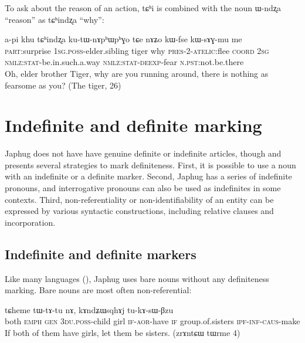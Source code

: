 \documentclass[oldfontcommands,oneside,a4paper,11pt]{memoir}
\newcommand{\ipa}[1]{{\phon #1}} %
\newcommand{\aor}{\textsc{aor}}
\newcommand{\caus}{\textsc{caus}}
\newcommand{\coord}{\textsc{coord}}
\newcommand{\du}{\textsc{du}}
\newcommand{\emphat}{\textsc{emph}}
\newcommand{\gen}{\textsc{gen}}
\newcommand{\inftv}{\textsc{inf}}
\newcommand{\ipf}{\textsc{ipf}}
\newcommand{\nmlz}{\textsc{nmlz}}
\newcommand{\npst}{\textsc{n.pst}}
\newcommand{\poss}{\textsc{poss}}
\newcommand{\pres}{\textsc{pres}}
\newcommand{\sg}{\textsc{sg}}
\newcommand{\stat}{\textsc{stat}}
\begin{document}
To ask about the reason of an action,  \ipa{tɕʰi} is combined with the noun \ipa{ɯ-ndʐa} ``reason'' as \ipa{tɕʰindʐa} ``why'':
  \begin{exe}
\ex
\gll    \ipa{ama} 	\ipa{a-pi} 	\ipa{khu} 	\ipa{tɕʰindʐa} 	\ipa{ku-tɯ-nɤpʰɯpʰɣo} 	\ipa{tɕe} 	\ipa{nɤʑo} 	\ipa{kɯ-fse} 	\ipa{kɯ-sɤɣ-mu} 	\ipa{me}   \\
\textsc{part}:surprise 1\sg{}.\poss{}-elder.sibling   tiger why \pres{}-2-\textsc{atelic}:flee \coord{} 2\sg{} \nmlz{}:\stat{}-be.in.such.a.way \nmlz{}:\stat{}-\textsc{deexp}-fear \npst{}:not.be.there \\
\glt Oh, elder brother Tiger, why are you running around, there is nothing as fearsome as you?  (The tiger, 26)
\end{exe} 

 

\section{Indefinite and definite marking}
Japhug does not have have genuine definite or indefinite articles, though and presents several strategies to mark definiteness. First, it is possible to use a noun with an indefinite or a definite marker. Second, Japhug has a series of indefinite pronouns, and interrogative pronouns can also be used as indefinites in some contexts. Third, non-referentiality or non-identifiability of an entity can be expressed by various syntactic constructions, including relative clauses and incorporation.


\subsection{Indefinite and definite markers}
Like many languages (\citealt[130]{creissels06sgit1}), Japhug  uses bare nouns without any definiteness marking. Bare nouns are most often non-referential:

  \begin{exe}
\ex
\gll \ipa{ʁnaʁna} 		\ipa{tɕheme} 	\ipa{tɯ-tɤ-tu} 	\ipa{nɤ,} 	\ipa{kɤndʑɯsqhɤj} 	\ipa{tu-kɤ-sɯ-βzu} \\
both \emphat{} \gen{} 3\du{}.\poss{}-child girl \textsc{if}-\aor{}-have \textsc{if} group.of.sisters \ipf{}-\inftv{}-\caus{}-make \\
\glt If both of them have girls, let them be sisters. (zrɤntɕɯ tɯrme 4)
\end{exe}
\end{document}
